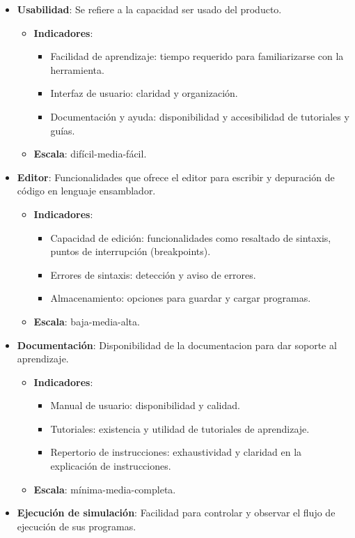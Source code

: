 \documentclass[12pt,twoside]{templates/unerthesis}
\providecommand{\tightlist}{%
  \setlength{\itemsep}{0pt}\setlength{\parskip}{0pt}}
\begin{document}
\begin{itemize}
\tightlist
\item
  \textbf{Usabilidad}: Se refiere a la capacidad ser usado del producto.

  \begin{itemize}
  \tightlist
  \item
    \textbf{Indicadores}:

    \begin{itemize}
    \tightlist
    \item
      Facilidad de aprendizaje: tiempo requerido para familiarizarse con la herramienta.
    \item
      Interfaz de usuario: claridad y organización.
    \item
      Documentación y ayuda: disponibilidad y accesibilidad de tutoriales y guías.
    \end{itemize}
  \item
    \textbf{Escala}: difícil-media-fácil.
  \end{itemize}
\item
  \textbf{Editor}: Funcionalidades que ofrece el editor para escribir y depuración de código en lenguaje ensamblador.

  \begin{itemize}
  \tightlist
  \item
    \textbf{Indicadores}:

    \begin{itemize}
    \tightlist
    \item
      Capacidad de edición: funcionalidades como resaltado de sintaxis, puntos de interrupción (breakpoints).
    \item
      Errores de sintaxis: detección y aviso de errores.
    \item
      Almacenamiento: opciones para guardar y cargar programas.
    \end{itemize}
  \item
    \textbf{Escala}: baja-media-alta.
  \end{itemize}
\item
  \textbf{Documentación}: Disponibilidad de la documentacion para dar soporte al aprendizaje.

  \begin{itemize}
  \tightlist
  \item
    \textbf{Indicadores}:

    \begin{itemize}
    \tightlist
    \item
      Manual de usuario: disponibilidad y calidad.
    \item
      Tutoriales: existencia y utilidad de tutoriales de aprendizaje.
    \item
      Repertorio de instrucciones: exhaustividad y claridad en la explicación de instrucciones.
    \end{itemize}
  \item
    \textbf{Escala}: mínima-media-completa.
  \end{itemize}
\item
  \textbf{Ejecución de simulación}: Facilidad para controlar y observar el flujo de ejecución de sus programas.


\end{itemize}
\end{document}
